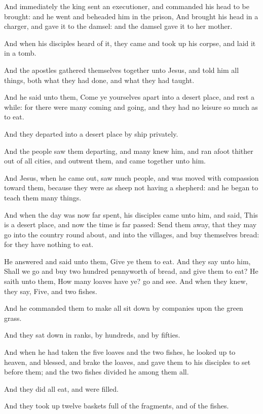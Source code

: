 \Verse And immediately the king sent an executioner, and commanded his head to be brought: and he went and beheaded him in the prison, \Verse And brought his head in a charger, and gave it to the damsel: and the damsel gave it to her mother.

\Verse And when his disciples heard of it, they came and took up his corpse, and laid it in a tomb.

\Verse And the apostles gathered themselves together unto Jesus, and told him all things, both what they had done, and what they had taught.

\Verse And he said unto them, Come ye yourselves apart into a desert place, and rest a while: for there were many coming and going, and they had no leisure so much as to eat.

\Verse And they departed into a desert place by ship privately.

\Verse And the people saw them departing, and many knew him, and ran afoot thither out of all cities, and outwent them, and came together unto him.

\Verse And Jesus, when he came out, saw much people, and was moved with compassion toward them, because they were as sheep not having a shepherd: and he began to teach them many things.

\Verse And when the day was now far spent, his disciples came unto him, and said, This is a desert place, and now the time is far passed: \Verse Send them away, that they may go into the country round about, and into the villages, and buy themselves bread: for they have nothing to eat.

\Verse He answered and said unto them, Give ye them to eat. And they say unto him, Shall we go and buy two hundred pennyworth of bread, and give them to eat?  \Verse He saith unto them, How many loaves have ye?  go and see. And when they knew, they say, Five, and two fishes.

\Verse And he commanded them to make all sit down by companies upon the green grass.

\Verse And they sat down in ranks, by hundreds, and by fifties.

\Verse And when he had taken the five loaves and the two fishes, he looked up to heaven, and blessed, and brake the loaves, and gave them to his disciples to set before them; and the two fishes divided he among them all.

\Verse And they did all eat, and were filled.

\Verse And they took up twelve baskets full of the fragments, and of the fishes.

